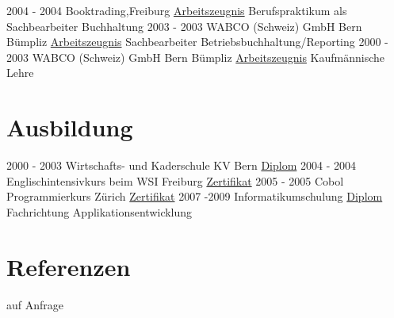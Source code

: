 \documentclass[letterpaper]{twentysecondcv} %
\begin{document}
\begin{twenty}
	\twentyitem
    	{2004 - 2004}
	{}
        {Booktrading,\textnormal{Freiburg}}
        {\href{http://www.uoguelph.ca/}{Arbeitszeugnis}}
        {Berufspraktikum als Sachbearbeiter Buchhaltung}
	{}
	\twentyitem
    	{2003 - 2003}
	{}
        {WABCO (Schweiz) GmbH \textnormal{Bern Bümpliz}}
        {\href{http://www.uoguelph.ca/}{Arbeitszeugnis}}
        {Sachbearbeiter Betriebsbuchhaltung/Reporting}
	{}
	\twentyitem
    	{2000 - 2003}
	{}
        {WABCO (Schweiz) GmbH \textnormal{Bern Bümpliz}}
        {\href{http://www.uoguelph.ca/}{Arbeitszeugnis}}
        {Kaufmännische Lehre}
	{}
\end{twenty}
\section{Ausbildung}

\begin{twenty} %
	\twentyitem
    	{2000 - 2003}
        {}
        {Wirtschafts- und Kaderschule \textnormal{KV Bern}}
        {\hyperref[sec:hello]{Diplom}}
        {}
        {}
	\twentyitem
    	{2004 - 2004}
		{}
        {Englischintensivkurs beim WSI \textnormal{Freiburg}}
        {\hyperref[sec:hello]{Zertifikat}}
        {}
        {}
\twentyitem
    	{2005 - 2005}
		{}
        {Cobol Programmierkurs \textnormal{Zürich}}
        {\hyperref[sec:hello]{Zertifikat}}
        {}
        {}
\twentyitem
    	{2007 -2009}
		{}
        {Informatikumschulung}
        {\hyperref[sec:hello]{Diplom}}
        {Fachrichtung Applikationsentwicklung}
        {}
\end{twenty}



\section{Referenzen}

\begin{twenty} %
\twentyitem
    	{auf Anfrage}
	{}
        {}
        {}
        {}
        {}

        
\end{twenty}
\end{document}
